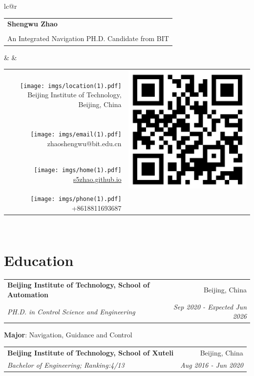 \documentclass[letterpaper,10pt]{article}
\makeatletter
\newcommand{\resumeItemNoBullet}[2]{
  \item[]\small{
    \hspace{-9pt}\textbf{#1}{: #2 \vspace{-6pt}}
  }
}
\newcommand{\resumeSubheading}[4]{
  \vspace{-1pt}\item[]
  \begin{tabular*}{0.98\textwidth}{l@{\extracolsep{\fill}}r}
      \hspace{-10pt}\textbf{#1} & #2 \\
      \hspace{-10pt}\textit{\small#3} & \textit{\small #4} \\
    \end{tabular*}\vspace{-5pt}
}
\newcommand{\resumeSubHeadingListStart}{\begin{itemize}[leftmargin=*]}
\newcommand{\resumeSubHeadingListEnd}{\end{itemize}}
\newcommand{\shorterSection}[1]{\vspace{-10pt}\section{#1}}
\makeatother
\begin{document}

\begin{table}[]
\begin{tabular*}{\textwidth}{lc@{\extracolsep{\fill}}r}
\begin{tabular}{l}
\textbf{\huge \textcolor{titleblue}{Shengwu Zhao}} \\
\\
An Integrated Navigation PH.D. Candidate from BIT  
\end{tabular}  &  & \begin{tabular}{@{}rr@{}} \textcolor{titleblue}{\texttt{[image: imgs/location(1).pdf]}} Beijing Institute of Technology, Beijing, China & \multirow{3}{*}{\includegraphics[width=0.086\linewidth]{imgs/githubpage.png}} \\
\texttt{[image: imgs/email(1).pdf]}
zhaoshengwu@bit.edu.cn                   &                   \\
\texttt{[image: imgs/home(1).pdf]} \href{https://s5zhao.github.io/}{s5zhao.github.io}                            &                   \\
\texttt{[image: imgs/phone(1).pdf]} +8618811693687                                  &                   
\end{tabular}  \\ 
\end{tabular*}
\end{table}

\vspace*{-10mm}


\shorterSection{\textcolor{titleblue}{Education}}
  \resumeSubHeadingListStart
    \resumeSubheading
      {Beijing Institute of Technology, School of Automation}{Beijing, China}     {PH.D. in Control Science and Engineering}{Sep 2020 - Expected Jun 2026}{
      \resumeItemNoBullet{Major}{Navigation, Guidance and Control}
    }
    \resumeSubheading
      {Beijing Institute of Technology, School of Xuteli}{Beijing, China}     {Bachelor of  Engineering;  Ranking:4/13}{Aug 2016 - Jun 2020}
  \resumeSubHeadingListEnd
  
\end{document}

